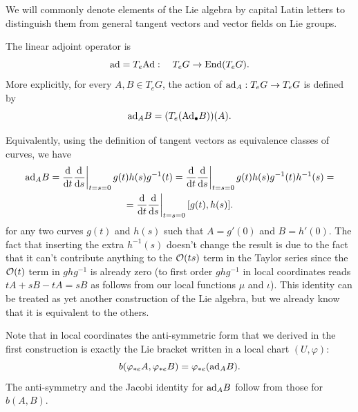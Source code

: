 We will commonly denote elements of the Lie algebra by capital Latin letters to distinguish them from general tangent vectors and vector fields on Lie groups.

\begin{defn}
    The linear adjoint operator is
    \[\mathrm{ad}=T_e \mathrm{Ad}: \quad T_eG\to \operatorname{End}(T_eG).\]
    More explicitly, for every $A,B\in T_eG$, the action of $\mathrm{ad}_A:T_eG\to T_eG$ is defined by
    \[\mathrm{ad}_A B=(T_e(\mathrm{Ad}_\bullet B))(A).\]
\end{defn}

Equivalently, using the definition of tangent vectors as equivalence classes of curves, we have
\begin{multline}
    \ad_A B=\restr{\frac{\dd}{\dd t} \frac{\dd}{\dd s}}{t=s=0}g(t)h(s)g^{-1}(t)=\restr{\frac{\dd}{\dd t} \frac{\dd}{\dd s}}{t=s=0}g(t)h(s)g^{-1}(t)h^{-1}(s)=\\=\restr{\frac{\dd}{\dd t} \frac{\dd}{\dd s}}{t=s=0}{} [g(t),h(s)].\label{30071}
\end{multline}
for any two curves $g(t)$ and $h(s)$ such that $A=g'(0)$ and $B=h'(0)$. The fact that inserting the extra $h^{-1}(s)$ doesn't change the result is due to the fact that it can't contribute anything to the $\mathcal{O}(ts)$ term in the Taylor series since the $\mathcal{O}(t)$ term in $ghg^{-1}$ is already zero (to first order $ghg^{-1}$ in local coordinates reads $tA+sB-tA=sB$ as follows from our local functions $\mu$ and $\iota$). This identity can be treated as yet another construction of the Lie algebra, but we already know that it is equivalent to the others.

Note that in local coordinates the anti-symmetric form that we derived in the first construction is exactly the Lie bracket written in a local chart $(U,\varphi)$:
\[b(\varphi_{\ast e} A,\varphi_{\ast e} B)=\varphi_{\ast e}(\mathrm{ad}_A B).\]
The anti-symmetry and the Jacobi identity for $\mathrm{ad}_A B$ follow from those for $b(A,B)$.

